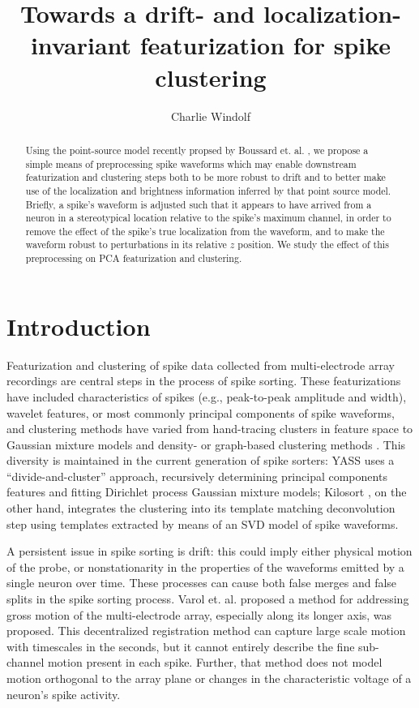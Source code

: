 \documentclass[
  12pt,
]{article}
\theoremstyle{plain}
\theoremstyle{definition}
\theoremstyle{remark}
\newcommand{\1}[1]{\mathbb{1}_{{#1}}}
\begin{document}
\author{Charlie Windolf}
\title{Towards a drift- and localization-invariant featurization for spike clustering}
\maketitle

\begin{abstract}
Using the point-source model recently propsed by Boussard et. al. \cite{boussard}, we propose a simple means of preprocessing spike waveforms which may enable downstream featurization and clustering steps both to be more robust to drift and to better make use of the localization and brightness information inferred by that point source model. Briefly, a spike's waveform is adjusted such that it appears to have arrived from a neuron in a stereotypical location relative to the spike's maximum channel, in order to remove the effect of the spike's true localization from the waveform, and to make the waveform robust to perturbations in its relative $z$ position. We study the effect of this preprocessing on PCA featurization and clustering.
\end{abstract}

\vspace{1em}

\section{Introduction}

Featurization and clustering of spike data collected from multi-electrode array recordings \cite{Jun2017,Steinmetz2021} are central steps in the process of spike sorting. These featurizations have included characteristics of spikes (e.g., peak-to-peak amplitude and width), wavelet features, or most commonly principal components of spike waveforms, and clustering methods have varied from hand-tracing clusters in feature space to Gaussian mixture models and density- or graph-based clustering methods \cite{quiroga}. This diversity is maintained in the current generation of spike sorters: YASS \cite{yass} uses a ``divide-and-cluster'' approach, recursively determining principal components features and fitting Dirichlet process Gaussian mixture models; Kilosort \cite{kilosort}, on the other hand, integrates the clustering into its template matching deconvolution step using templates extracted by means of an SVD model of spike waveforms.

A persistent issue in spike sorting is drift: this could imply either physical motion of the probe, or nonstationarity in the properties of the waveforms emitted by a single neuron over time. These processes can cause both false merges and false splits in the spike sorting process. Varol et. al. \cite{icassp} proposed a method for addressing gross motion of the multi-electrode array, especially along its longer axis, was proposed. This decentralized registration method can capture large scale motion with timescales in the seconds, but it cannot entirely describe the fine sub-channel motion present in each spike. Further, that method does not model motion orthogonal to the array plane or changes in the characteristic voltage of a neuron's spike activity.
\end{document}
